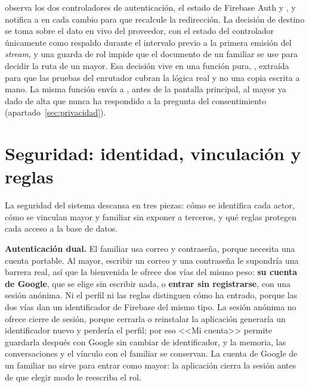  observa los dos controladores de autenticación, el estado de Firebase Auth y , y notifica a  en cada cambio para que recalcule la redirección. La decisión de destino se toma sobre el dato en vivo del proveedor, con el estado del controlador únicamente como respaldo durante el intervalo previo a la primera emisión del \emph{stream}, y una guarda de rol impide que el documento de un familiar se use para decidir la ruta de un mayor. Esa decisión vive en una función pura, , extraída para que las pruebas del enrutador cubran la lógica real y no una copia escrita a mano. La misma función envía a , antes de la pantalla principal, al mayor ya dado de alta que nunca ha respondido a la pregunta del consentimiento (apartado~\ref{sec:privacidad}).

\section{Seguridad: identidad, vinculación y reglas}
\label{sec:seguridad}

La seguridad del sistema descansa en tres piezas: cómo se identifica cada actor, cómo se vinculan mayor y familiar sin exponer a terceros, y qué reglas protegen cada acceso a la base de datos.

\textbf{Autenticación dual.} El familiar usa correo y contraseña, porque necesita una cuenta portable. Al mayor, escribir un correo y una contraseña le supondría una barrera real, así que la bienvenida le ofrece dos vías del mismo peso: \textbf{su cuenta de Google}, que se elige sin escribir nada, o \textbf{entrar sin registrarse}, con una sesión anónima. Ni el perfil ni las reglas distinguen cómo ha entrado, porque las dos vías dan un identificador de Firebase del mismo tipo. La sesión anónima no ofrece cierre de sesión, porque cerrarla o reinstalar la aplicación generaría un identificador nuevo y perdería el perfil; por eso <<Mi cuenta>> permite guardarla después con Google sin cambiar de identificador, y la memoria, las conversaciones y el vínculo con el familiar se conservan. La cuenta de Google de un familiar no sirve para entrar como mayor: la aplicación cierra la sesión antes de que elegir modo le reescriba el rol.

